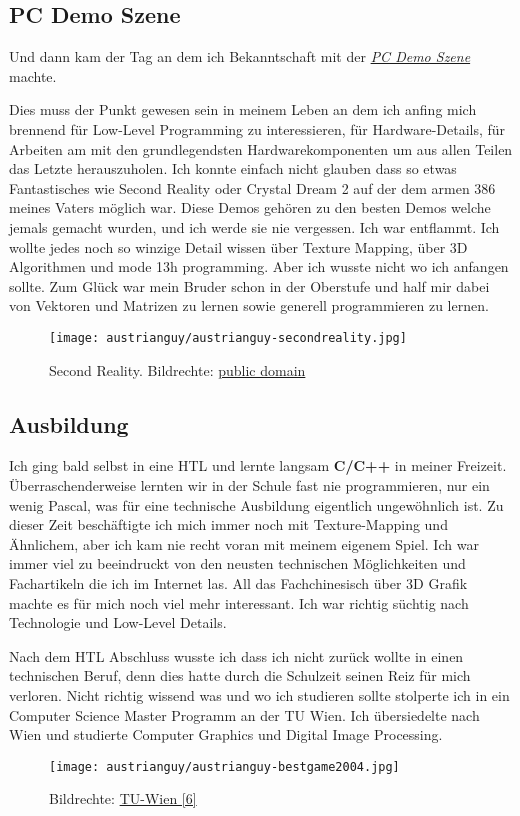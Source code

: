 \documentclass[10pt,a4paper,ngerman,twoside]{article} %
\begin{document}
\subsection*{PC Demo Szene}

Und dann kam der Tag an dem ich Bekanntschaft mit der \href{https://de.wikipedia.org/wiki/Demoszene}{\textit{PC Demo Szene}} machte.

Dies muss der Punkt gewesen sein in meinem Leben an dem ich anfing mich brennend für Low-Level Programming zu interessieren, für Hardware-Details, für Arbeiten am mit den grundlegendsten Hardwarekomponenten um aus allen Teilen das Letzte herauszuholen. Ich konnte einfach nicht glauben dass so etwas Fantastisches wie Second Reality oder Crystal Dream 2 auf der dem armen 386 meines Vaters möglich war. Diese Demos gehören zu den besten Demos welche jemals gemacht wurden, und ich werde sie nie vergessen. Ich war entflammt. Ich wollte jedes noch so winzige Detail wissen über Texture Mapping, über 3D Algorithmen und mode 13h programming. Aber ich wusste nicht wo ich anfangen sollte. Zum Glück war mein Bruder schon in der Oberstufe und half mir dabei von Vektoren und Matrizen zu lernen sowie generell  programmieren zu lernen.

\begin{figure}
\texttt{[image: austrianguy/austrianguy-secondreality.jpg]}\\
\caption{Second Reality. Bildrechte: \href{https://en.wikipedia.org/wiki/en:public_domain}{public domain}}
\end{figure}

\subsection*{Ausbildung}

Ich ging bald selbst in eine HTL und lernte langsam \textbf{C/C++} in meiner Freizeit. Überraschenderweise lernten wir in der Schule fast nie programmieren, nur ein wenig Pascal, was für eine technische Ausbildung eigentlich ungewöhnlich ist. Zu dieser Zeit beschäftigte ich mich immer noch mit Texture-Mapping und Ähnlichem, aber ich kam nie recht voran mit meinem eigenem Spiel. Ich war immer viel zu beeindruckt von den neusten technischen Möglichkeiten und Fachartikeln die ich im Internet las. All das Fachchinesisch über 3D Grafik machte es für mich noch viel mehr interessant. Ich war richtig süchtig nach Technologie und Low-Level Details.

Nach dem HTL Abschluss wusste ich dass ich nicht zurück wollte in einen technischen Beruf, denn dies hatte durch die Schulzeit seinen Reiz für mich verloren. Nicht richtig wissend was und wo ich studieren sollte stolperte ich in ein Computer Science Master Programm an der TU Wien. Ich übersiedelte nach Wien und studierte Computer Graphics und Digital Image Processing.
\begin{figure}
    \texttt{[image: austrianguy/austrianguy-bestgame2004.jpg]}
    \caption{Bildrechte: \href{http://www.cg.tuwien.ac.at/courses/CG23/HallOfFame/2004/}{TU-Wien [6]}}
\end{figure}
\end{document}
